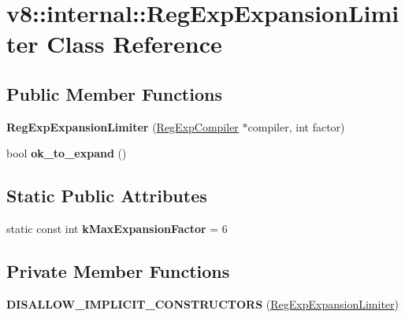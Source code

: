 \hypertarget{classv8_1_1internal_1_1_reg_exp_expansion_limiter}{}\section{v8\+:\+:internal\+:\+:Reg\+Exp\+Expansion\+Limiter Class Reference}
\label{classv8_1_1internal_1_1_reg_exp_expansion_limiter}
\subsection*{Public Member Functions}
\begin{DoxyCompactItemize}
\item 
{\bfseries Reg\+Exp\+Expansion\+Limiter} (\hyperlink{classv8_1_1internal_1_1_reg_exp_compiler}{Reg\+Exp\+Compiler} $\ast$compiler, int factor)\hypertarget{classv8_1_1internal_1_1_reg_exp_expansion_limiter_a48f9e2f2adff3a1ed31337230f1fd599}{}\label{classv8_1_1internal_1_1_reg_exp_expansion_limiter_a48f9e2f2adff3a1ed31337230f1fd599}

\item 
bool {\bfseries ok\+\_\+to\+\_\+expand} ()\hypertarget{classv8_1_1internal_1_1_reg_exp_expansion_limiter_a06bcd44dbe9806935f1c4acfd25ef07e}{}\label{classv8_1_1internal_1_1_reg_exp_expansion_limiter_a06bcd44dbe9806935f1c4acfd25ef07e}

\end{DoxyCompactItemize}
\subsection*{Static Public Attributes}
\begin{DoxyCompactItemize}
\item 
static const int {\bfseries k\+Max\+Expansion\+Factor} = 6\hypertarget{classv8_1_1internal_1_1_reg_exp_expansion_limiter_a8c34bb2b6e52fc4be6f4a544643f47c6}{}\label{classv8_1_1internal_1_1_reg_exp_expansion_limiter_a8c34bb2b6e52fc4be6f4a544643f47c6}

\end{DoxyCompactItemize}
\subsection*{Private Member Functions}
\begin{DoxyCompactItemize}
\item 
{\bfseries D\+I\+S\+A\+L\+L\+O\+W\+\_\+\+I\+M\+P\+L\+I\+C\+I\+T\+\_\+\+C\+O\+N\+S\+T\+R\+U\+C\+T\+O\+RS} (\hyperlink{classv8_1_1internal_1_1_reg_exp_expansion_limiter}{Reg\+Exp\+Expansion\+Limiter})\hypertarget{classv8_1_1internal_1_1_reg_exp_expansion_limiter_a43150f2741d44a136a0c0c06d2054982}{}\label{classv8_1_1internal_1_1_reg_exp_expansion_limiter_a43150f2741d44a136a0c0c06d2054982}

\end{DoxyCompactItemize}
